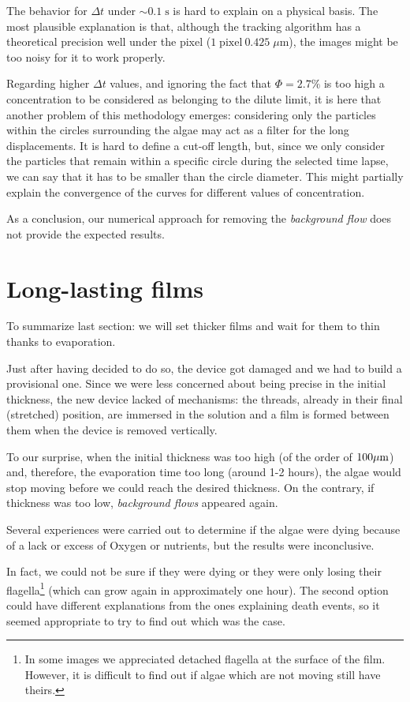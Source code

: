 The behavior for $\Delta t$ under $\sim 0.1 \; \textrm{s}$ is hard to explain on a physical basis. The most plausible explanation is that, although the tracking algorithm has a theoretical precision well under the pixel ($1 \; \textrm{pixel} ~ 0.425 \; \mu \textrm{m}$), the images might be too noisy for it to work properly.

Regarding higher $\Delta t$ values, and ignoring the fact that $\Phi = 2.7\%$ is too high a concentration to be considered as belonging to the dilute limit, it is here that another problem of this methodology emerges: considering only the particles within the circles surrounding the algae may act as a filter for the long displacements. It is hard to define a cut-off length, but, since we only consider the particles that remain within a specific circle during the selected time lapse, we can say that it has to be smaller than the circle diameter. This might partially explain the convergence of the curves for different values of concentration.

As a conclusion, our numerical approach for removing the \textit{background flow} does not provide the expected results.

\section{Long-lasting films}

To summarize last section: we will set thicker films and wait for them to thin thanks to evaporation.

Just after having decided to do so, the device got damaged and we had to build a provisional one. Since we were less concerned about being precise in the initial thickness, the new device lacked of mechanisms: the threads, already in their final (stretched) position, are immersed in the solution and a film is formed between them when the device is removed vertically.

To our surprise, when the initial thickness was too high (of the order of $100 \mu \textrm m$) and, therefore, the evaporation time too long (around 1-2 hours), the algae would stop moving before we could reach the desired thickness. On the contrary, if thickness was too low, \textit{background flows} appeared again.

Several experiences were carried out to determine if the algae were dying because of a lack or excess of Oxygen or nutrients, but the results were inconclusive. 

In fact, we could not be sure if they were dying or they were only losing their flagella\footnote{In some images we appreciated detached flagella at the surface of the film. However, it is difficult to find out if algae which are not moving still have theirs.} (which can grow again in approximately one hour). The second option could have different explanations from the ones explaining death events, so it seemed appropriate to try to find out which was the case.

